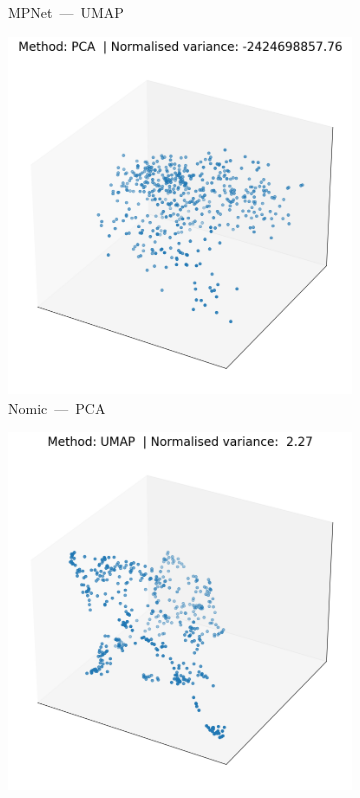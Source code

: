\documentclass[10pt,oneside]{report}
\begin{document}
\begin{figure}[htbp]
\begin{subfigure}[b]{0.48\textwidth}
    \caption{MPNet --- UMAP}
    \label{fig:umapTest-mpnet}
  \end{subfigure}
  \vspace{1em} %
  \begin{subfigure}[b]{0.48\textwidth}
    \centering
    \includegraphics[width=\textwidth]{pcaTestNomic.png}
    \caption{Nomic --- PCA}
    \label{fig:pcaTest-nomic}
  \end{subfigure}%
  \hfill
  \begin{subfigure}[b]{0.48\textwidth}
    \centering
    \includegraphics[width=\textwidth]{umapTestNomic.png}

\end{subfigure}
\end{figure}
\end{document}
